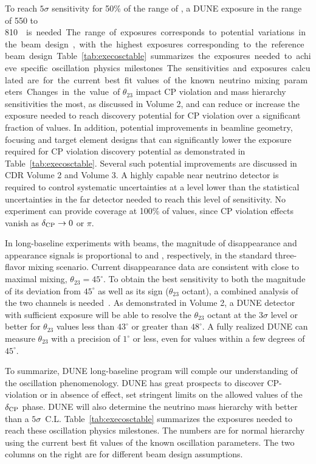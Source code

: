 To reach $5\sigma$ sensitivity for 50\% of the range of \deltacp, a
DUNE exposure in the range of \num{550} to \SI{810}\ktMWyr{}  is needed. The
range of exposures corresponds to potential variations in the beam
design, with the highest exposures corresponding to the reference beam
design. Table~\ref{tab:execosctable} summarizes the exposures needed to
achieve specific oscillation physics milestones.  The sensitivities
and exposures calculated are for the current best fit values of the
known neutrino mixing parameters. Changes in the value of
$\theta_{23}$ impact CP violation and mass hierarchy sensitivities the
most, as discussed in Volume 2, and can reduce or increase the exposure
needed to reach discovery potential for CP violation over a
significant fraction of \deltacp values. In addition, potential
improvements in beamline geometry, focusing and target element designs
that can significantly lower the exposure required for CP violation
discovery potential as demonstrated in Table~\ref{tab:execosctable}. Several such potential improvements are discussed
in CDR Volume 2 and Volume 3. A highly capable near neutrino detector
is required to control systematic uncertainties at a level lower than
the statistical uncertainties in the far detector needed to reach this
level of sensitivity.  No experiment can provide coverage at 100\% of
\deltacp values, since CP violation effects vanish as $\mdeltacp\to 0$
or $\pi$.
  
In long-baseline experiments with \numu beams, the
magnitude of \numu disappearance and \nue appearance signals is
proportional to  and ,
respectively, in the standard three-flavor mixing scenario.  Current
\numu disappearance data are consistent with close to maximal
mixing, $\theta_{23} = 45^\circ$.  To obtain the best sensitivity to
both the magnitude of its deviation from $45^\circ$ as well as its
sign ($\theta_{23}$ octant), a combined analysis of the two channels
is needed~\cite{Huber:2010dx}.  As demonstrated in Volume 2, a
 DUNE detector with sufficient exposure will be able to
resolve the $\theta_{23}$ octant at the $3\sigma$ level or better for
$\theta_{23}$ values less than $43^\circ$ or greater than $48^\circ$.
A fully realized DUNE can measure $\theta_{23}$ with a precision of
$1^\circ$ or less, even for values within a few degrees of
$45^\circ$. 

To summarize, DUNE long-baseline program will comple
our understanding of the oscillation phenomenology. 
DUNE has great prospects to discover CP-violation or in absence of
effect, set stringent limits on the allowed values of the $\delta_{\rm CP}$
phase. DUNE will also determine the neutrino mass hierarchy with better
than a $5\sigma$~C.L.
Table~\ref{tab:execosctable} summarizes the exposures
needed to reach these oscillation physics
 milestones. The numbers are for normal hierarchy using the current best fit values of the known oscillation parameters. The two columns
    on the right are for different beam design assumptions. 

